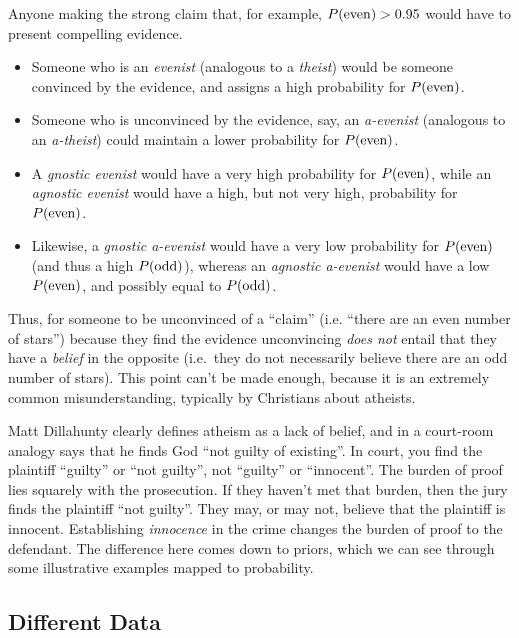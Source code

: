 \documentclass{tufte-book}
\begin{document}
Anyone making the strong claim that, for example, \(P({\rm even})>0.95\)
would have to present compelling evidence.

\begin{itemize}
\itemsep1pt\parskip0pt
\item
  Someone who is an \emph{evenist} (analogous to a \emph{theist}) would
  be someone convinced by the evidence, and assigns a high probability
  for \(P({\rm even})\).\\
\item
  Someone who is unconvinced by the evidence, say, an \emph{a-evenist}
  (analogous to an \emph{a-theist}) could maintain a lower probability
  for \(P({\rm even})\).\\
\item
  A \emph{gnostic evenist} would have a very high probability for
  \(P({\rm even})\), while an \emph{agnostic evenist} would have a high,
  but not very high, probability for \(P({\rm even})\).\\
\item
  Likewise, a \emph{gnostic a-evenist} would have a very low probability
  for \(P({\rm even})\) (and thus a high \(P({\rm odd})\)), whereas an
  \emph{agnostic a-evenist} would have a low \(P({\rm even})\), and
  possibly equal to \(P({\rm odd})\).
\end{itemize}

Thus, for someone to be unconvinced of a ``claim'' (i.e. ``there are an
even number of stars'') because they find the evidence unconvincing
\emph{does not} entail that they have a \emph{belief} in the opposite
(i.e.~they do not necessarily believe there are an odd number of stars).
This point can't be made enough, because it is an extremely common
misunderstanding, typically by Christians about atheists.

Matt Dillahunty clearly defines atheism as a lack of belief, and in a
court-room analogy says that he finds God ``not guilty of existing''. In
court, you find the plaintiff ``guilty'' or ``not guilty'', not
``guilty'' or ``innocent''. The burden of proof lies squarely with the
prosecution. If they haven't met that burden, then the jury finds the
plaintiff ``not guilty''. They may, or may not, believe that the
plaintiff is innocent. Establishing \emph{innocence} in the crime
changes the burden of proof to the defendant. The difference here comes
down to priors, which we can see through some illustrative examples
mapped to probability.

\subsection{Different Data}\label{different-data}
\end{document}
